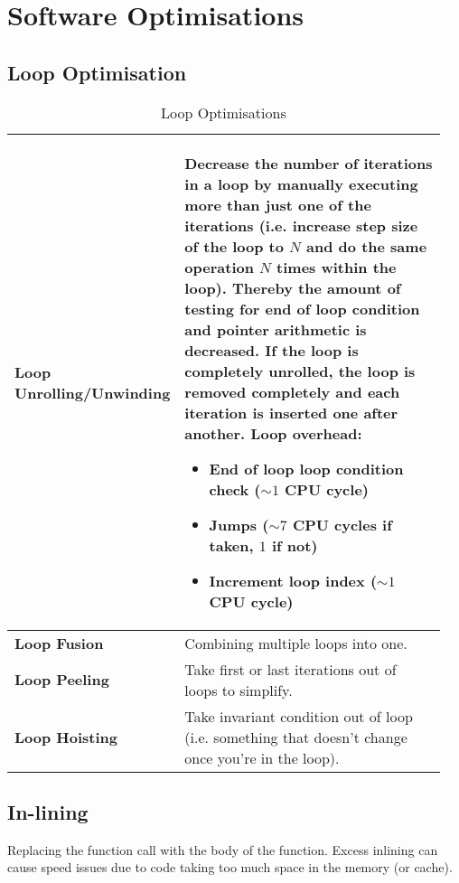 \section{Software Optimisations }
	\subsection{Loop Optimisation }				
		\begin{table}[H]
			\centering
			\begin{tabular}{|p{0.3\linewidth}|p{0.65\linewidth}|}
					\hline
					\textbf{Loop Unrolling/Unwinding}
						& Decrease the number of iterations in a loop by manually executing more than just one of the iterations (i.e. increase step size of the loop to $N$ and do the same operation $N$ times within the loop). Thereby the amount of testing for end of loop condition and pointer arithmetic is decreased. If the loop is completely unrolled, the loop is removed completely and each iteration is inserted one after another.\newline
						\textbf{Loop overhead:}\newline
						\begin{itemize}
						  \item End of loop loop condition check ($\sim 1$ CPU cycle)
						  \item Jumps ($\sim 7$ CPU cycles if taken, $1$ if not)
						  \item Increment loop index ($\sim 1$ CPU cycle)
						\end{itemize}\\
					\hline
					\textbf{Loop Fusion}
						& Combining multiple loops into one.\\
					\hline
					\textbf{Loop Peeling}
						& Take first or last iterations out of loops to simplify.\\
					\hline
					\textbf{Loop Hoisting}
						& Take invariant condition out of loop (i.e. something that doesn't change once you're in the loop).\\
					\hline
			\end{tabular}
			\caption{Loop Optimisations}
		\end{table}
		
		
	\subsection{In-lining}
		Replacing the function call with the body of the function. Excess inlining can cause speed issues due to code taking too much space in the memory (or cache).